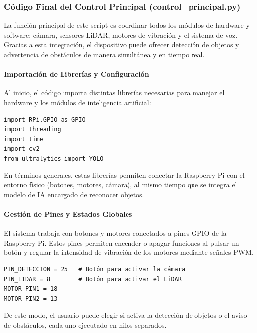 \documentclass[12pt,a4paper]{article}
\begin{document}
\subsubsection{Código Final del Control Principal (control\_principal.py)}

La función principal de este script es coordinar todos los módulos de hardware y software: cámara, sensores LiDAR, motores de vibración y el sistema de voz. Gracias a esta integración, el dispositivo puede ofrecer detección de objetos y advertencia de obstáculos de manera simultánea y en tiempo real.

\paragraph{Importación de Librerías y Configuración}

\begin{itemize}
Al inicio, el código importa distintas librerías necesarias para manejar el hardware y los módulos de inteligencia artificial:
\end{itemize}


\begin{verbatim}
import RPi.GPIO as GPIO
import threading
import time
import cv2
from ultralytics import YOLO
\end{verbatim}

En términos generales, estas librerías permiten conectar la Raspberry Pi con el entorno físico (botones, motores, cámara), al mismo tiempo que se integra el modelo de IA encargado de reconocer objetos.

\paragraph{Gestión de Pines y Estados Globales}
\begin{itemize}

El sistema trabaja con botones y motores conectados a pines GPIO de la Raspberry Pi. Estos pines permiten encender o apagar funciones al pulsar un botón y regular la intensidad de vibración de los motores mediante señales PWM.

\end{itemize}

\begin{verbatim}
PIN_DETECCION = 25   # Botón para activar la cámara
PIN_LIDAR = 8        # Botón para activar el LiDAR
MOTOR_PIN1 = 18
MOTOR_PIN2 = 13
\end{verbatim}

De este modo, el usuario puede elegir si activa la detección de objetos o el aviso de obstáculos, cada uno ejecutado en hilos separados.
\end{document}
